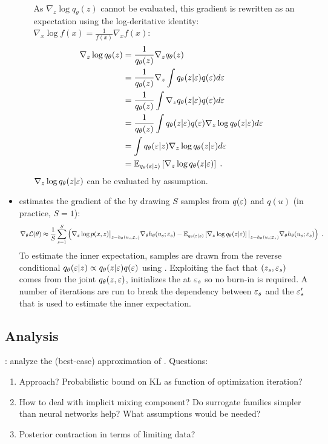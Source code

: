 \documentclass[10pt]{article}
\begin{document}
\begin{itemize}
\begin{itemize}
As $\nabla_z\log q_\theta(z)$ cannot be evaluated, this gradient is rewritten as an expectation using the log-deritative identity: $\nabla_x\log f(x) = \frac{1}{f(x)}\nabla_x f(x)$:
\begin{align*}
\nabla_z\log q_\theta(z) &= \frac{1}{q_\theta(z)}\nabla_zq_\theta(z) \\
&= \frac{1}{q_\theta(z)}\nabla_z\int q_\theta(z|\varepsilon)q(\varepsilon)d\varepsilon \\
&= \frac{1}{q_\theta(z)}\int \nabla_z q_\theta(z|\varepsilon)q(\varepsilon)d\varepsilon \\
&= \frac{1}{q_\theta(z)}\int q_\theta(z|\varepsilon)q(\varepsilon)\nabla_z\log q_\theta(z|\varepsilon)d\varepsilon \\
&= \int q_\theta(\varepsilon|z)\nabla_z\log q_\theta(z|\varepsilon)d\varepsilon \\
&= \mathbb{E}_{q_\theta(\varepsilon|z)}\left[\nabla_z\log q_\theta(z|\varepsilon)\right]\;.
\end{align*}
$\nabla_z\log q_\theta(z|\varepsilon)$ can be evaluated by assumption.
\end{itemize}
\item
\uivi estimates the gradient of the \elbo by drawing $S$ samples from $q(\varepsilon)$ and $q(u)$ (in practice, $S=1$):
\[
\nabla_\theta\mathcal{L}(\theta) \approx \frac{1}{S}\sum_{s=1}^S\left(\nabla_z\log p(x,z)\big|_{z=h_\theta(u_s,\varepsilon_s)}\nabla_\theta h_\theta(u_s;\varepsilon_s) - \mathbb{E}_{q_\theta(\varepsilon|z)}\left[\nabla_z\log q_\theta(z|\varepsilon)\right]\big|_{z=h_\theta(u_s;\varepsilon_s)}\nabla_\theta h_\theta(u_s;\varepsilon_s)\right) \;.
\]
To estimate the inner expectation, samples are drawn from the reverse conditional $q_\theta(\varepsilon|z)\propto q_\theta(z|\varepsilon)q(\varepsilon)$ using \mcmc. Exploiting the fact that $(z_s,\varepsilon_s)$ comes from the joint $q_\theta(z,\varepsilon)$, \uivi initializes the \mcmc at $\varepsilon_s$ so no burn-in is required. A number of iterations are run to break the dependency between $\varepsilon_s$ and the $\varepsilon_s'$ that is used to estimate the inner expectation.

\end{itemize}

\subsection{Analysis}

\todo: analyze the (best-case) approximation of \uivi. Questions:
\begin{enumerate}
\item
Approach? Probabilistic bound on KL as function of \elbo optimization iteration?
\item
How to deal with implicit mixing component? Do surrogate families simpler than neural networks help? What assumptions would be needed?
\item
Posterior contraction in terms of limiting data?
\end{enumerate}
\end{document}
